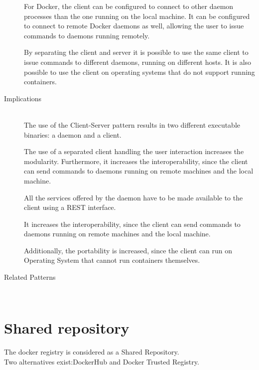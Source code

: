 \begin{description}
For Docker, the client can be configured to connect to other daemon processes than the one running on the local machine. It can be configured to connect to remote Docker daemons as well, allowing the user to issue commands to daemons running remotely.


By separating the client and server it is possible to use the same client to issue commands to different daemons, running on different hosts.
It is also possible to use the client on operating systems that do not support running containers.

\item [Implications]~\\
The use of the Client-Server pattern results in two different executable binaries: a daemon and a client. 


The use of a separated client handling the user interaction increases the modularity.
Furthermore, it increases the interoperability, since the client can send commands to daemons running on remote machines and the local machine.

All the services offered by the daemon have to be made available to the client using a REST interface.

It increases the interoperability, since the client can send commands to daemons running on remote machines and the local machine.

Additionally, the portability is increased, since the client can run on Operating System that cannot run containers themselves.


\item [Related Patterns]~\\


\end{description}


\section{Shared repository}

The docker registry is considered as a Shared Repository. \\
Two alternatives exist:DockerHub and Docker Trusted Registry. \\


